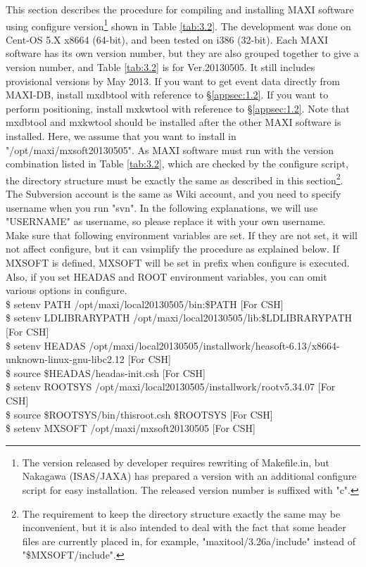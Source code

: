 \documentclass[10pt]{report}
\renewcommand{\_}{\textscale{.5}{\textbf{\textunderscore}}}
\begin{document}
This section describes the procedure for compiling and installing MAXI software using configure version\footnote{The version released by developer requires rewriting of Makefile.in, but Nakagawa (ISAS/JAXA) has prepared a version with an additional configure script for easy installation. The released version number is suffixed with "c".} shown in Table \ref{tab:3.2}. The development was done on Cent-OS 5.X x86\_64 (64-bit), and been tested on i386 (32-bit). Each MAXI software has its own version number, but they are also grouped together to give a version number, and Table \ref{tab:3.2} is for Ver.20130505. It still includes provisional versions by May 2013. If you want to get event data directly from MAXI-DB, install mxdbtool with reference to \S\ref{appsec:1.2}. If you want to perform positioning, install mxkwtool with reference to \S\ref{appsec:1.2}. Note that mxdbtool and mxkwtool should be installed after the other MAXI software is installed. Here, we assume that you want to install in "/opt/maxi/mxsoft\_20130505". As MAXI software must run with the version combination listed in Table \ref{tab:3.2}, which are checked by the configure script, the directory structure must be exactly the same as described in this section\footnote{The requirement to keep the directory structure exactly the same may be inconvenient, but it is also intended to deal with the fact that some header files are currently placed in, for example, "maxitool/3.26a/include" instead of "\$MXSOFT/include".}.\\
\indent The Subversion account is the same as Wiki account, and you need to specify username when you run "svn". In the following explanations, we will use "USERNAME" as username, so please replace it with your own username.\\
\indent Make sure that following environment variables are set. If they are not set, it will not affect configure, but it can vsimplify the procedure as explained below. If MXSOFT is defined, MXSOFT will be set in prefix when configure is executed. Also, if you set HEADAS and ROOT environment variables, you can omit various options in configure. \\

\noindent \$ setenv PATH /opt/maxi/local\_20130505/bin:\$PATH \phantom{aa}[For CSH]\\
\$ setenv LD\_LIBRARY\_PATH /opt/maxi/local\_20130505/lib:\$LD\_LIBRARY\_PATH \phantom{aa}[For CSH]\\
\$ setenv HEADAS /opt/maxi/local\_20130505/install\_work/heasoft-6.13/x86\_64-unknown-linux-gnu-libc2.12
\phantom{aa}[For CSH]\\
\$ source \$HEADAS/headas-init.csh \phantom{aa}[For CSH]\\
\$ setenv ROOTSYS /opt/maxi/local\_20130505/install\_work/root\_v5.34.07 \phantom{aa}[For CSH]\\
\$ source \$ROOTSYS/bin/thisroot.csh \$ROOTSYS \phantom{aa}[For CSH]\\
\$ setenv MXSOFT /opt/maxi/mxsoft\_20130505 \phantom{aa}[For CSH]\\
\end{document}
